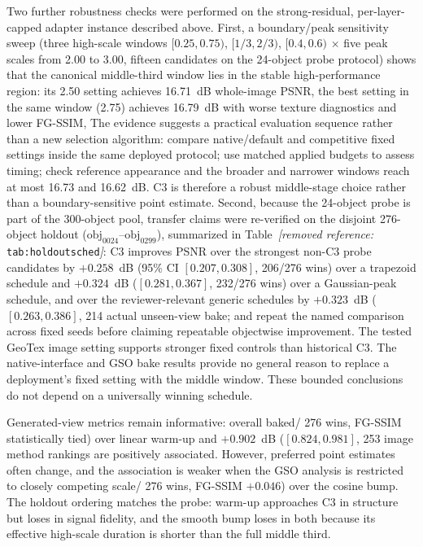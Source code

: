 \documentclass[times,twocolumn,final]{elsarticle}
\providecommand{\DIFadd}[1]{{\protect\color{blue} \sf #1}} %
\providecommand{\DIFdel}[1]{{\protect\color{red} \scriptsize #1}} %
\providecommand{\DIFaddbegin}{} %
\providecommand{\DIFaddend}{} %
\providecommand{\DIFdelbegin}{} %
\providecommand{\DIFdelend}{} %
\begin{document}
\DIFdelbegin \DIFdel{Two further robustness checks were performed on the strong-residual, per-layer-capped adapter instance described above. First, a boundary/peak sensitivity sweep (three high-scale windows $[0.25,0.75)$, $[1/3,2/3)$, $[0.4,0.6)$ $\times$ five peak scales from 2.00 to 3.00, fifteen candidates on the 24-object probe protocol) shows that the canonical middle-third window lies in the stable high-performance region: its 2.50 setting achieves 16.71~dB whole-image PSNR, the best setting in the same window (2.75) achieves 16.79~dB with worse texture diagnostics and lower FG-SSIM, }\DIFdelend \DIFaddbegin \DIFadd{The evidence suggests a practical evaluation sequence rather than a new selection algorithm: compare native/default }\DIFaddend and \DIFaddbegin \DIFadd{competitive fixed settings inside the same deployed protocol; use matched applied budgets to assess timing; check reference appearance and }\DIFaddend the \DIFdelbegin \DIFdel{broader and narrower windows reach at most 16.73 and 16.62~dB. C3 is therefore a robust middle-stage choice rather than a boundary-sensitive point estimate. Second, because the 24-object probe is part of the 300-object pool, transfer claims were re-verified on the disjoint 276-object holdout ($\mathrm{obj}_{0024}$--$\mathrm{obj}_{0299}$), summarized in Table~\textit{[removed reference: }\texttt{tab:holdoutsched}\textit{]}: C3 improves PSNR over the strongest non-C3 probe candidates by $+0.258$~dB (95\% CI $[0.207,0.308]$, 206/276 wins) over a trapezoid schedule and $+0.324$~dB ($[0.281,0.367]$, 232/276 wins) over a Gaussian-peak schedule, and over the reviewer-relevant generic schedules by $+0.323$~dB ($[0.263,0.386]$, 214}\DIFdelend \DIFaddbegin \DIFadd{actual unseen-view bake; and repeat the named comparison across fixed seeds before claiming repeatable objectwise improvement. The tested GeoTex image setting supports stronger fixed controls than historical C3. The native-interface and GSO bake results provide no general reason to replace a deployment's fixed setting with the middle window. These bounded conclusions do not depend on a universally winning schedule.
}

\DIFadd{Generated-view metrics remain informative: overall baked}\DIFaddend /\DIFdelbegin \DIFdel{276 wins, FG-SSIM statistically tied) over linear warm-up and $+0.902$~dB ($[0.824,0.981]$, 253}\DIFdelend \DIFaddbegin \DIFadd{image method rankings are positively associated. However, preferred point estimates often change, and the association is weaker when the GSO analysis is restricted to closely competing scale}\DIFaddend /\DIFdelbegin \DIFdel{276 wins, FG-SSIM $+0.046$) over the cosine bump. The holdout ordering matches the probe: warm-up approaches C3 in structure but loses in signal fidelity, and the smooth bump loses in both because its effective high-scale duration is shorter than the full middle third. }%
\end{document}

